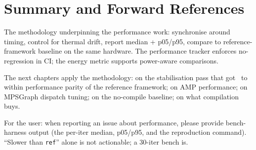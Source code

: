\section{Summary and Forward References}
\label{sec:perf_methodology:summary}

The methodology underpinning the performance work: synchronise
around timing, control for thermal drift, report median + p05/p95,
compare to reference-framework baseline on the same hardware. The
performance tracker enforces no-regression in CI; the energy
metric supports power-aware comparisons.

The next chapters apply the methodology:
 on the stabilisation pass that got
\Lucid\ to within performance parity of the reference framework;
 on AMP performance; 
on MPSGraph dispatch tuning;  on the
no-compile baseline;  on what
compilation buys.

\begin{lucidnote}
For the user: when reporting an issue about performance, please
provide bench-harness output (the per-iter median, p05/p95, and
the reproduction command). ``Slower than \texttt{ref}'' alone is
not actionable; a 30-iter bench is.
\end{lucidnote}
